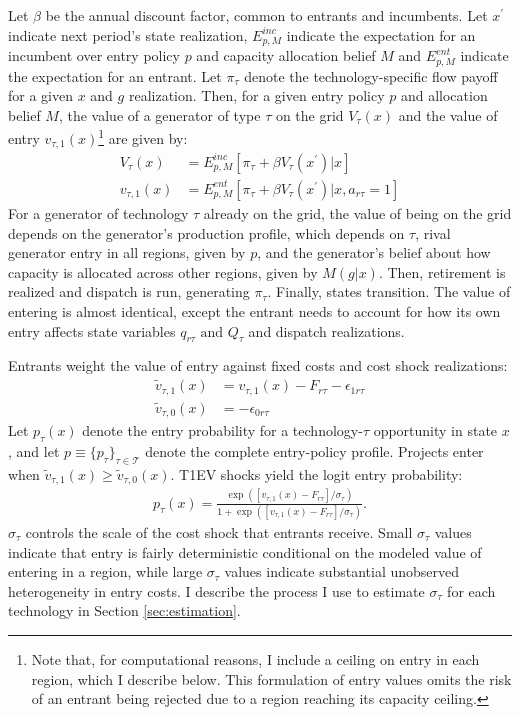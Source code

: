 \documentclass[12pt]{article}
\begin{document}
Let $\beta$ be the annual discount factor, common to entrants and incumbents. Let $x^\prime$ indicate next period's state realization, $E^{inc}_{p,M}$ indicate the expectation for an incumbent over entry policy $p$ and capacity allocation belief $M$ and $E^{ent}_{p,M}$ indicate the expectation for an entrant. Let $\pi_\tau$ denote the technology-specific flow payoff for a given $x$ and $g$ realization. Then, for a given entry policy $p$ and allocation belief $M$, the value of a generator of type $\tau$ on the grid $V_\tau(x)$ and the value of entry $v_{\tau,1}(x)$\footnote{Note that, for computational reasons, I include a ceiling on entry in each region, which I describe below. This formulation of entry values omits the risk of an entrant being rejected due to a region reaching its capacity ceiling.} are given by:
\begin{align}
    \label{eq:value_func}
    V_\tau(x) &= E^{inc}_{p,M} [\pi_\tau + \beta V_\tau(x^\prime)|x] \\
    v_{\tau,1}(x) &= E^{ent}_{p,M}[\pi_\tau + \beta V_\tau(x^\prime)| x, a_{r\tau}=1]
\end{align}
For a generator of technology $\tau$ already on the grid, the value of being on the grid depends on the generator's production profile, which depends on $\tau$, rival generator entry in all regions, given by $p$, and the generator's belief about how capacity is allocated across other regions, given by $M(g|x)$. Then, retirement is realized and dispatch is run, generating $\pi_\tau$. Finally, states transition. The value of entering is almost identical, except the entrant needs to account for how its own entry affects state variables $q_{r\tau} \text{ and } Q_\tau$ and dispatch realizations.

Entrants weight the value of entry against fixed costs and cost shock realizations:
\begin{align}
    \tilde{v}_{\tau,1}(x) &= v_{\tau, 1}(x) - F_{r\tau} - \epsilon_{1r\tau} \\
    \tilde{v}_{\tau,0}(x) &= - \epsilon_{0r\tau}
\end{align}
Let $p_\tau(x)$ denote the entry probability for a technology-$\tau$ opportunity in state $x$, and let $p \equiv \{p_\tau\}_{\tau\in\mathcal{T}}$ denote the complete entry-policy profile. Projects enter when $\tilde{v}_{\tau,1}(x) \geq \tilde{v}_{\tau,0}(x)$. T1EV shocks yield the logit entry probability:
\begin{align}
    \label{eq:entry_policy}
    p_\tau(x)
    = \frac{\exp\left(\left[v_{\tau,1}(x)-F_{r\tau}\right]/\sigma_\tau\right)}
    {1+\exp\left(\left[v_{\tau,1}(x)-F_{r\tau}\right]/\sigma_\tau\right)}.
\end{align}
$\sigma_\tau$ controls the scale of the cost shock that entrants receive. Small $\sigma_\tau$ values indicate that entry is fairly deterministic conditional on the modeled value of entering in a region, while large $\sigma_\tau$ values indicate substantial unobserved heterogeneity in entry costs. I describe the process I use to estimate $\sigma_\tau$ for each technology in Section \ref{sec:estimation}.
\end{document}
